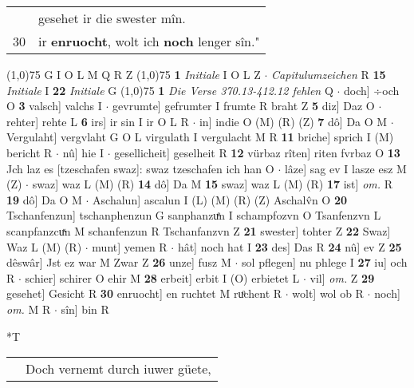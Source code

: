 \documentclass[8pt,a4paper,notitlepage]{article}
\begin{document}
\begin{table}[ht]
\begin{minipage}[t]{0.5\linewidth}
\begin{tabular}{rl}
 & gesehet ir die swester mîn.\\ 
30 & ir \textbf{enruocht}, wolt ich \textbf{noch} lenger sîn."\\ 
\end{tabular}
\scriptsize
\line(1,0){75} \newline
G I O L M Q R Z \newline
\line(1,0){75} \newline
\textbf{1} \textit{Initiale} I O L Z   $\cdot$ \textit{Capitulumzeichen} R  \textbf{15} \textit{Initiale} I  \textbf{22} \textit{Initiale} G  \newline
\line(1,0){75} \newline
\textbf{1} \textit{Die Verse 370.13-412.12 fehlen} Q   $\cdot$ doch] ÷och O \textbf{3} valsch] valchs I  $\cdot$ gevrumte] gefrumter I frumte R braht Z \textbf{5} diz] Daz O  $\cdot$ rehter] rehte L \textbf{6} irs] ir sin I ir O L R  $\cdot$ in] indie O (M) (R) (Z) \textbf{7} dô] Da O M  $\cdot$ Vergulaht] vergvlaht G O L virgulath I vergulacht M R \textbf{11} briche] sprich I (M) bericht R  $\cdot$ nû] hie I  $\cdot$ gesellicheit] geselheit R \textbf{12} vürbaz rîten] riten fvrbaz O \textbf{13} Jch laz es [tzeschafen swaz]:  swaz tzeschafen ich han O  $\cdot$ lâze] sag ev I lasze esz M (Z)  $\cdot$ swaz] waz L (M) (R) \textbf{14} dô] Da M \textbf{15} swaz] waz L (M) (R) \textbf{17} ist] \textit{om.} R \textbf{19} dô] Da O M  $\cdot$ Aschalun] ascalun I (L) (M) (R) (Z) Aschalv̂n O \textbf{20} Tschanfenzun] tschanphenzun G sanphanzuͤn I schampfozvn O Tsanfenzvn L scanpfanzcuͯn M schanfenzun R Tschanfanzvn Z \textbf{21} swester] tohter Z \textbf{22} Swaz] Waz L (M) (R)  $\cdot$ munt] yemen R  $\cdot$ hât] noch hat I \textbf{23} des] Das R \textbf{24} nû] ev Z \textbf{25} dêswâr] Jst ez war M Zwar Z \textbf{26} unze] fusz M  $\cdot$ sol pflegen] nu phlege I \textbf{27} iu] och R  $\cdot$ schier] schirer O ehir M \textbf{28} erbeit] erbit I (O) erbietet L  $\cdot$ vil] \textit{om.} Z \textbf{29} gesehet] Gesicht R \textbf{30} enruocht] en ruchtet M ruͦchent R  $\cdot$ wolt] wol ob R  $\cdot$ noch] \textit{om.} M R  $\cdot$ sîn] bin R \newline
\end{minipage}
\hspace{0.5cm}
\begin{minipage}[t]{0.5\linewidth}
\small
\begin{center}*T
\end{center}
\begin{tabular}{rl}
 & Doch vernemt durch iuwer güete,\\ 

\end{tabular}
\end{minipage}
\end{table}
\end{document}
